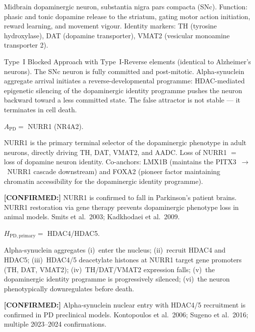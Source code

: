 \documentclass[12pt,a4paper]{article}
\newcommand{\confirmed}[1]{\noindent\colorbox{green!10}{\parbox{\dimexpr\linewidth-2\fboxsep}{%
  \textbf{[CONFIRMED:]} #1}}\vspace{0.4em}}
\begin{document}
\begin{description}[leftmargin=2em, itemsep=0.5em]
  \item[\textbf{Step~1 --- Cell of origin:}]
    Midbrain dopaminergic neuron, substantia nigra pars compacta (SNc).
    Function: phasic and tonic dopamine release to the striatum, gating
    motor action initiation, reward learning, and movement vigour.
    Identity markers: TH (tyrosine hydroxylase), DAT (dopamine transporter),
    VMAT2 (vesicular monoamine transporter 2).

  \item[\textbf{Step~2 --- Axiom type:}]
    Type~I Blocked Approach with Type~I-Reverse elements (identical to
    Alzheimer's neurons). The SNc neuron is fully committed and post-mitotic.
    Alpha-synuclein aggregate arrival initiates a reverse-developmental
    programme: HDAC-mediated epigenetic silencing of the dopaminergic
    identity programme pushes the neuron backward toward a less committed
    state. The false attractor is not stable --- it terminates in cell death.

  \item[\textbf{Step~3 --- Identity Anchor ($A$):}]
    $A_{\mathrm{PD}} = $ NURR1 (NR4A2).

    NURR1 is the primary terminal selector of the dopaminergic phenotype
    in adult neurons, directly driving TH, DAT, VMAT2, and AADC. Loss of
    NURR1 $=$ loss of dopamine neuron identity. Co-anchors: LMX1B (maintains
    the PITX3~$\to$~NURR1 cascade downstream) and FOXA2 (pioneer factor
    maintaining chromatin accessibility for the dopaminergic identity
    programme).

    \confirmed{NURR1 is confirmed to fall in Parkinson's patient brains.
    NURR1 restoration via gene therapy prevents dopaminergic phenotype loss
    in animal models. Smits et al.\ 2003; Kadkhodaei et al.\ 2009.}

  \item[\textbf{Step~4 --- Convergence Hub ($H$):}]
    $H_{\mathrm{PD,primary}} = $ HDAC4/HDAC5.

    Alpha-synuclein aggregates (i)~enter the nucleus; (ii)~recruit HDAC4
    and HDAC5; (iii)~HDAC4/5 deacetylate histones at NURR1 target gene
    promoters (TH, DAT, VMAT2); (iv)~TH/DAT/VMAT2 expression falls;
    (v)~the dopaminergic identity programme is progressively silenced;
    (vi)~the neuron phenotypically downregulates before death.

    \confirmed{Alpha-synuclein nuclear entry with HDAC4/5 recruitment is
    confirmed in PD preclinical models. Kontopoulos et al.\ 2006;
    Sugeno et al.\ 2016; multiple 2023--2024 confirmations.}


\end{description}
\end{document}
